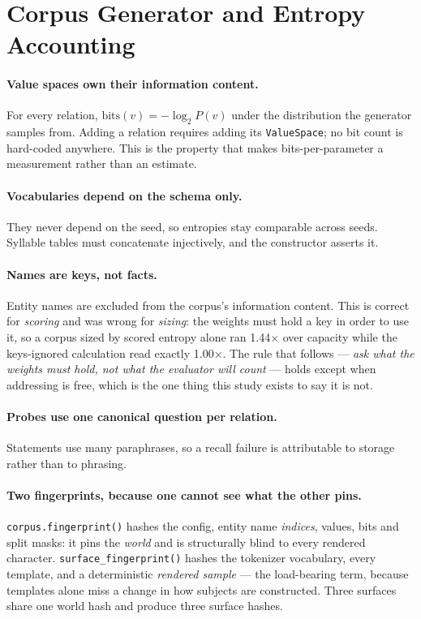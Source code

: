 \section{Corpus Generator and Entropy Accounting}
\label{app:corpus}

\paragraph{Value spaces own their information content.} For every relation,
$\mathrm{bits}(v) = -\log_2 P(v)$ under the distribution the generator samples from. Adding a
relation requires adding its \texttt{ValueSpace}; no bit count is hard-coded anywhere. This is the
property that makes bits-per-parameter a measurement rather than an estimate.

\paragraph{Vocabularies depend on the schema only.} They never depend on the seed, so entropies stay
comparable across seeds. Syllable tables must concatenate injectively, and the constructor asserts
it.

\paragraph{Names are keys, not facts.} Entity names are excluded from the corpus's information
content. This is correct for \emph{scoring} and was wrong for \emph{sizing}: the weights must hold a
key in order to use it, so a corpus sized by scored entropy alone ran 1.44$\times$ over capacity
while the keys-ignored calculation read exactly 1.00$\times$. The rule that follows --- \emph{ask
what the weights must hold, not what the evaluator will count} --- holds except when addressing is
free, which is the one thing this study exists to say it is not.

\paragraph{Probes use one canonical question per relation.} Statements use many
paraphrases, so a recall failure is attributable to storage rather than to phrasing.

\paragraph{Two fingerprints, because one cannot see what the other pins.}
\texttt{corpus.fingerprint()} hashes the config, entity name \emph{indices}, values, bits and split
masks: it pins the \emph{world} and is structurally blind to every rendered character.
\texttt{surface\_fingerprint()} hashes the tokenizer vocabulary, every template, and a deterministic
\emph{rendered sample} --- the load-bearing term, because templates alone miss a change in how
subjects are constructed. Three surfaces share one world hash and produce three surface hashes.

